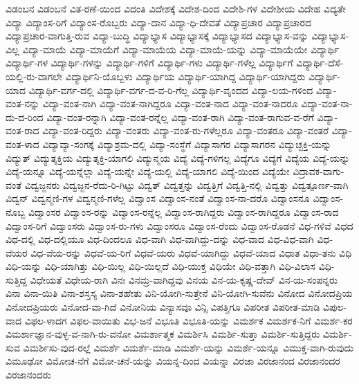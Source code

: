 {ವಿಡಂಬನ
ವಿಡಂಬನೆ
ವಿತ-ರಣೆ-ಯಿಂದ
ವಿದಂತಿ
ವಿದೇಶಕ್ಕೆ
ವಿದೇಶ-ದಿಂದ
ವಿದೇಶಿ-ಗಳ
ವಿದೇಶೀಯ
ವಿದೇಹ
ವಿದ್ಯತೇ
ವಿದ್ಯಾ
ವಿದ್ಯಾಂಸ-ರಿಗೆ
ವಿದ್ಯಾಂಸ-ರೊಬ್ಬರು
ವಿದ್ಯಾ-ದಾನ
ವಿದ್ಯಾ-ಧಿ-ದೇವತೆ
ವಿದ್ಯಾಪ್ರಚಾರ
ವಿದ್ಯಾಪ್ರಚಾರದ
ವಿದ್ಯಾಪ್ರಚಾರ-ವಾಗುತ್ತಿ-ರುವ
ವಿದ್ಯಾ-ಬುದ್ಧಿ
ವಿದ್ಯಾಭ್ಯಾಸ
ವಿದ್ಯಾಭ್ಯಾಸಕ್ಕೆ
ವಿದ್ಯಾಭ್ಯಾಸದ
ವಿದ್ಯಾಭ್ಯಾಸ-ವನ್ನು
ವಿದ್ಯಾಭ್ಯಾಸ-ವಿಲ್ಲ
ವಿದ್ಯಾ-ಮಾಯೆ
ವಿದ್ಯಾ-ಮಾಯೆಗೆ
ವಿದ್ಯಾ-ಮಾಯೆಯ
ವಿದ್ಯಾ-ಮಾಯೆ-ಯನ್ನು
ವಿದ್ಯಾ-ಮಾಯೆಯೇ
ವಿದ್ಯಾರ್ಥಿ
ವಿದ್ಯಾರ್ಥಿ-ಗಳ
ವಿದ್ಯಾರ್ಥಿ-ಗಳನ್ನು
ವಿದ್ಯಾರ್ಥಿ-ಗಳಿಗೆ
ವಿದ್ಯಾರ್ಥಿ-ಗಳು
ವಿದ್ಯಾರ್ಥಿ-ಗಳೆಲ್ಲ
ವಿದ್ಯಾರ್ಥಿಗೆ
ವಿದ್ಯಾರ್ಥಿ-ದೆಸೆ-ಯಲ್ಲಿ-ರು-ವಾಗಲೇ
ವಿದ್ಯಾರ್ಥಿನಿ-ಯೊಬ್ಬಳು
ವಿದ್ಯಾರ್ಥಿಯ
ವಿದ್ಯಾರ್ಥಿ-ಯಾಗಿದ್ದ
ವಿದ್ಯಾರ್ಥಿ-ಯಾಗಿದ್ದರು
ವಿದ್ಯಾರ್ಥಿ-ಯಾದ
ವಿದ್ಯಾರ್ಥಿ-ವರ್ಗ-ದಲ್ಲಿ
ವಿದ್ಯಾರ್ಥಿ-ವರ್ಗ-ದ-ವ-ರಿ-ಗೆಲ್ಲ
ವಿದ್ಯಾರ್ಥಿ-ವೃಂದದ
ವಿದ್ಯಾ-ಲಯ-ಗಳಿಂದ
ವಿದ್ಯಾ-ವಂತ-ನನ್ನು
ವಿದ್ಯಾ-ವಂತ-ನಾಗಿ
ವಿದ್ಯಾ-ವಂತ-ನಾಗಿದ್ದರೂ
ವಿದ್ಯಾ-ವಂತ-ನಾದ
ವಿದ್ಯಾ-ವಂತ-ನಾದರೂ
ವಿದ್ಯಾ-ವಂತ-ನಾ-ದು-ದ-ರಿಂದ
ವಿದ್ಯಾ-ವಂತ-ರನ್ನಾಗಿ
ವಿದ್ಯಾ-ವಂತ-ರನ್ನೆಲ್ಲ
ವಿದ್ಯಾ-ವಂತ-ರಾಗಿ
ವಿದ್ಯಾ-ವಂತ-ರಾಗುವ-ವ-ರೆಗೆ
ವಿದ್ಯಾ-ವಂತ-ರಾದ
ವಿದ್ಯಾ-ವಂತ-ರಿದ್ದರು
ವಿದ್ಯಾ-ವಂತರು
ವಿದ್ಯಾ-ವಂತ-ರು-ಗಳೆಲ್ಲರೂ
ವಿದ್ಯಾ-ವಂತರೂ
ವಿದ್ಯಾ-ವಂತರೆ
ವಿದ್ಯಾ-ವಂತ-ಳಾದ
ವಿದ್ಯಾವ್ಯಾ-ಸಂಗಕ್ಕೆ
ವಿದ್ಯಾಶ್ರಮ-ದಲ್ಲಿ
ವಿದ್ಯಾ-ಸಂಸ್ಥೆಗೆ
ವಿದ್ಯಾಸಾಗರ
ವಿದ್ಯಾಸಾಗರನ
ವಿದ್ಯುಚ್ಛಕ್ತಿ-ಯನ್ನು
ವಿದ್ಯುತ್
ವಿದ್ಯುತ್ಶಕ್ತಿಯ
ವಿದ್ಯುತ್ಶಕ್ತಿ-ಯಾಗಲಿ
ವಿದ್ಯುನ್ಮಯ
ವಿದ್ಯೆ
ವಿದ್ಯೆ-ಗಳಿಗಲ್ಲ
ವಿದ್ಯೆಗೂ
ವಿದ್ಯೆಗೆ
ವಿದ್ಯೆಯ
ವಿದ್ಯೆ-ಯನ್ನು
ವಿದ್ಯೆ-ಯನ್ನೂ
ವಿದ್ಯೆ-ಯನ್ನೆಲ್ಲಾ
ವಿದ್ಯೆ-ಯನ್ನೇ
ವಿದ್ಯೆ-ಯಲ್ಲಿ
ವಿದ್ಯೆ-ಯಾಗಲಿ
ವಿದ್ಯೆ-ಯಿಂದ
ವಿದ್ಯೆಯೇ
ವಿದ್ರಾವಕ-ವಾಗು-ವಂತೆ
ವಿದ್ವಜ್ಜನರು
ವಿದ್ವಜ್ಜನ-ರೆದು-ರಿ-ಗಿಟ್ಟು
ವಿದ್ವತ್
ವಿದ್ವತ್ತನ್ನು
ವಿದ್ವತ್ತಿಗೆ
ವಿದ್ವತ್ತಿ-ನಲ್ಲಿ
ವಿದ್ವತ್ತು
ವಿದ್ವತ್ಪೂರ್ಣ-ವಾಗಿ
ವಿದ್ವನ್
ವಿದ್ವನ್ಮಣಿ-ಗಳ
ವಿದ್ವನ್ಮಣಿ-ಗಳೆಲ್ಲ
ವಿದ್ವಾಂಸ
ವಿದ್ವಾಂಸ-ನಂತೆ
ವಿದ್ವಾಂಸ-ನಾ-ದರೊ
ವಿದ್ವಾಂಸನೂ
ವಿದ್ವಾಂಸ-ನೊಬ್ಬ
ವಿದ್ವಾಂಸರ
ವಿದ್ವಾಂಸ-ರನ್ನು
ವಿದ್ವಾಂಸ-ರನ್ನೆಲ್ಲ
ವಿದ್ವಾಂಸ-ರಾಗಿದ್ದರು
ವಿದ್ವಾಂಸ-ರಾಗಿದ್ದರೂ
ವಿದ್ವಾಂಸ-ರಾದ
ವಿದ್ವಾಂಸ-ರಿಗೆ
ವಿದ್ವಾಂಸರು
ವಿದ್ವಾಂಸ-ರು-ಗಳು
ವಿದ್ವಾಂಸರೂ
ವಿದ್ವಾಂಸ-ರೆಂದು
ವಿದ್ವಾಂಸ-ರೊಡನೆ
ವಿಧ-ಗಳಿವೆ
ವಿಧದ
ವಿಧ-ದಲ್ಲಿ
ವಿಧ-ದಲ್ಲಿಯೂ
ವಿಧ-ದಿಂದಲೂ
ವಿಧ-ವಾಗಿ
ವಿಧ-ವಾಗಿದ್ದು-ದನ್ನು
ವಿಧ-ವಾದ
ವಿಧ-ವಿಧ-ವಾಗಿ
ವಿಧ-ವೆಯರ
ವಿಧ-ವೆಯ-ರನ್ನು
ವಿಧವೆ-ಯ-ರಿಗೆ
ವಿಧವೆ-ಯರು
ವಿಧವೆ-ಯಾಗಿದ್ದು
ವಿಧವೆ-ಯಾದ
ವಿಧಾತ
ವಿಧಾ-ತನು
ವಿಧಿ
ವಿಧಿ-ಯನ್ನು
ವಿಧಿ-ಯಾಗಿತ್ತು
ವಿಧಿ-ಯಿಲ್ಲ
ವಿಧಿ-ಯಿಲ್ಲದೆ
ವಿಧಿ-ಯುಕ್ತ
ವಿಧಿಯೇ
ವಿಧಿ-ವತ್ತಾಗಿ
ವಿಧಿ-ವಿಲಾಸ
ವಿಧಿ-ಸುತ್ತಿದ್ದ
ವಿಧೇಯತೆ
ವಿಧೇಯ-ರಾಗಿ
ವಿನಃ
ವಿನಮ್ರ-ವಾಗಿದ್ದವು
ವಿನಯ
ವಿನ-ಯ-ಕೃಷ್ಣ-ದೇವ್
ವಿನ-ಯ-ಸಂಪನ್ನರು
ವಿನಾ
ವಿನಾ-ಯಿತಿ
ವಿನಾ-ಶಸ್ತಸ್ಯ
ವಿನಾ-ಶಹೇತು
ವಿನಿ-ಯೋಗಿ-ಸುತ್ತೇನೆ
ವಿನಿ-ಯೋಗಿ-ಸುವೆನು
ವಿನೋದ
ವಿನೋದಪ್ರಿಯ
ವಿನೋದಪ್ರಿಯರು
ವಿನೋದ-ವಾ-ಗಿದೆ
ವಿನೋನಿಯ
ವಿನ್ಯಾಸವೂ
ವಿನ್ಸಿ
ವಿಪತ್ತಿಗೂ
ವಿಪರೀತ
ವಿಪರೀತ-ಮಾಡಿ
ವಿಪುಲ-ವಾದ
ವಿಫಲ-ಳಾದಗ
ವಿಫಲ-ವಾಯಿತು
ವಿಭ-ಜನೆ
ವಿಭೂತಿ
ವಿಭೂತಿ-ಯನ್ನು
ವಿಮರ್ಶಕ
ವಿಮರ್ಶಕ-ನಿಗೆ
ವಿಮರ್ಶ-ಕರ
ವಿಮರ್ಶಾಜ್ಞಾನ-ವುಳ್ಳ-ವ-ನಾಗಿ-ರು-ವನೋ
ವಿಮರ್ಶಾತ್ಮಕ
ವಿಮರ್ಶಿಸಿ
ವಿಮರ್ಶಿ-ಸುತ್ತಾ
ವಿಮರ್ಶಿ-ಸುತ್ತಿದ್ದರು
ವಿಮರ್ಶಿ-ಸುವ
ವಿಮರ್ಶಿಸು-ವುದ-ರಲ್ಲೆ
ವಿಮರ್ಶೆ
ವಿಮರ್ಶೆ-ಮಾಡಿ
ವಿಮರ್ಶೆ-ಯನ್ನು
ವಿಮರ್ಶೆ-ಯನ್ನೂ
ವಿಮುಕ್ತ-ವಾಗಿ-ರುವುದು
ವಿಮೂಢೋ
ವಿಮೋಚ-ನೆಗೆ
ವಿಮೋ-ಚನೆ-ಯನ್ನು
ವಿಯನ್ನ-ದಿಂದ
ವಿಯನ್ನಾ
ವಿರಜಾ
ವಿರಜಾನಂದ
ವಿರಜಾನಂದರ
ವಿರಜಾನಂದರು
}
